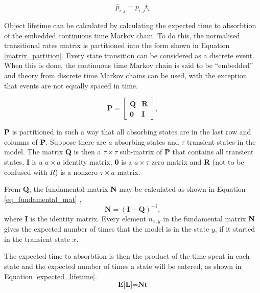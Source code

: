 \documentclass[10pt,a4paper,conference]{IEEEtran}
\begin{document}
\begin{equation} \label{eq_markov_normalisation}
    \hat{p}_{i, j} = p_{i, j} t_i
\end{equation}

Object lifetime can be calculated by calculating the expected time to absorbtion of the embedded continuous time Markov chain. To do this, the normalised transitional rates matrix is partitioned into the form shown in Equation \eqref{matrix_partition}. Every state transition can be considered as a discrete event. When this is done, the continuous time Markov chain is said to be ``embedded'' and theory from discrete time Markov chains can be used, with the exception that events are not equally spaced in time.

\begin{equation} \label{matrix_partition}
    \textbf{\^{P}} = \left[\begin{array}{c|c}
                   \textbf{Q} & \textbf{R} \\
                   \hline
                   \textbf{0} & \textbf{I}
                 \end{array}\right],
\end{equation}

\textbf{\^{P}} is partitioned in such a way that all absorbing states are in the last row and columns of \textbf{\^{P}}. Suppose there are $a$ absorbing states and $\tau$ transient states in the model. The matrix \textbf{Q} is then a $\tau\times\tau$ sub-matrix of \textbf{\^{P}} that contains all transient states. \textbf{I} is a $a \times a$ identity matrix, \textbf{0} is a $a\times\tau$ zero matrix and \textbf{R} (not to be confused with $R$) is a nonzero $\tau\times a$ matrix.

From \textbf{Q}, the fundamental matrix \textbf{N} may be calculated as shown in Equation \eqref{eq_fundamental_mat} \cite{grinstead1997introduction_probability},
%
\begin{equation} \label{eq_fundamental_mat}
    \textbf{N} = (\textbf{I} - \textbf{Q})^{-1},
\end{equation}
%
where \textbf{I} is the identity matrix. Every element $n_{x,y}$ in the fundamental matrix \textbf{N} gives the expected number of times that the model is in the state $y$, if it started in the transient state $x$.

The expected time to absorbtion is then the product of the time spent in each state and the expected number of times a state will be entered, as shown in Equation \eqref{expected_lifetime}.
%
\begin{equation} \label{expected_lifetime}
    \textbf{E[L]} = \textbf{Nt}
\end{equation}
\end{document}
